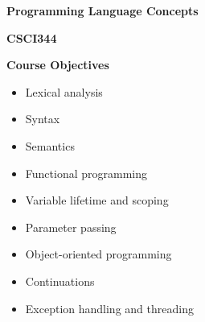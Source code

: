 \begin{minipage}[t]{\sw}
\slidenumber
\LARGE
\centerline{\bf Programming Language Concepts}
\centerline{\bf CSCI344}
{\bf Course Objectives}\\
\begin{itemize}
\item
  Lexical analysis
\item
  Syntax
\item
  Semantics
\item
  Functional programming
\item
  Variable lifetime and scoping
\item
  Parameter passing
\item
  Object-oriented programming
\item
  Continuations
\item
  Exception handling and threading
\end{itemize}
\end{minipage}
